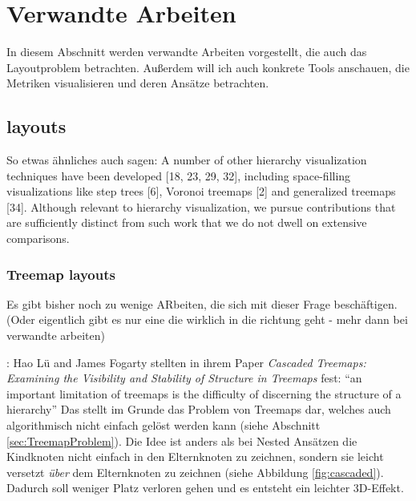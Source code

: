 \section{Verwandte Arbeiten} \label{sec:VerwandteArbeiten}
In diesem Abschnitt werden verwandte Arbeiten vorgestellt, die auch das Layoutproblem betrachten.
Außerdem will ich auch konkrete Tools anschauen, die Metriken visualisieren und deren Ansätze betrachten.

\subsection{layouts}

So etwas ähnliches auch sagen:
A number of other hierarchy visualization techniques have been
developed [18, 23, 29, 32], including space-filling visualizations
like step trees [6], Voronoi treemaps [2] and generalized treemaps
[34]. Although relevant to hierarchy visualization, we pursue
contributions that are sufficiently distinct from such work that we
do not dwell on extensive comparisons. \cite{lu2008cascaded}

\subsubsection{Treemap layouts}
Es gibt bisher noch zu wenige ARbeiten, die sich mit dieser Frage beschäftigen. (Oder eigentlich gibt es nur eine die wirklich in die richtung geht - mehr dann bei verwandte arbeiten)


\cite{lu2008cascaded}:
Hao Lü and James Fogarty stellten in ihrem Paper \textit{Cascaded Treemaps:
Examining the Visibility and Stability of Structure in Treemaps}\cite{lu2008cascaded} fest: \enquote{an important limitation of treemaps is
the difficulty of discerning the structure of a hierarchy}\cite[1]{lu2008cascaded} Das stellt im Grunde das Problem von Treemaps dar, welches auch algorithmisch nicht einfach gelöst werden kann (siehe Abschnitt \ref{sec:TreemapProblem}). Die Idee ist anders als bei Nested Ansätzen die Kindknoten nicht einfach in den Elternknoten zu zeichnen, sondern sie leicht versetzt \textit{über} dem Elternknoten zu zeichnen (siehe Abbildung \ref{fig:cascaded}). Dadurch soll weniger Platz verloren gehen und es entsteht ein leichter 3D-Effekt.

